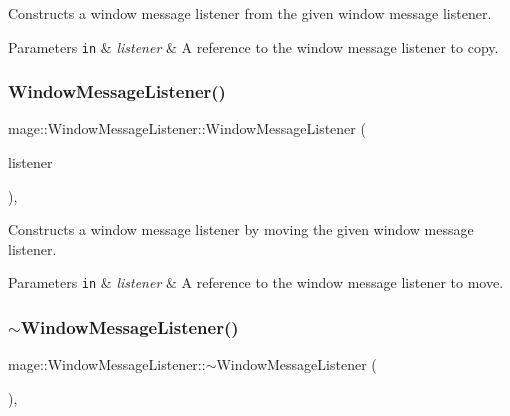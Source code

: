 Constructs a window message listener from the given window message listener.


\begin{DoxyParams}[1]{Parameters}
\mbox{\tt in}  & {\em listener} & A reference to the window message listener to copy. \\
\hline
\end{DoxyParams}
\mbox{\label{classmage_1_1_window_message_listener_a5d90d0e20cda37ee83a00696fb40f3c3}} 
\subsubsection{\texorpdfstring{Window\+Message\+Listener()}{WindowMessageListener()}\hspace{0.1cm}{\footnotesize\ttfamily [3/3]}}
{\footnotesize\ttfamily mage\+::\+Window\+Message\+Listener\+::\+Window\+Message\+Listener (\begin{DoxyParamCaption}\item[{\mbox{\hyperlink{classmage_1_1_window_message_listener}{Window\+Message\+Listener}} \&\&}]{listener }\end{DoxyParamCaption})\hspace{0.3cm}{\ttfamily [default]}, {\ttfamily [noexcept]}}

Constructs a window message listener by moving the given window message listener.


\begin{DoxyParams}[1]{Parameters}
\mbox{\tt in}  & {\em listener} & A reference to the window message listener to move. \\
\hline
\end{DoxyParams}
\mbox{\label{classmage_1_1_window_message_listener_ae0972346e59184cb01d674dfa8269d32}} 
\subsubsection{\texorpdfstring{$\sim$\+Window\+Message\+Listener()}{~WindowMessageListener()}}
{\footnotesize\ttfamily mage\+::\+Window\+Message\+Listener\+::$\sim$\+Window\+Message\+Listener (\begin{DoxyParamCaption}{ }\end{DoxyParamCaption})\hspace{0.3cm}{\ttfamily [virtual]}, {\ttfamily [default]}}

